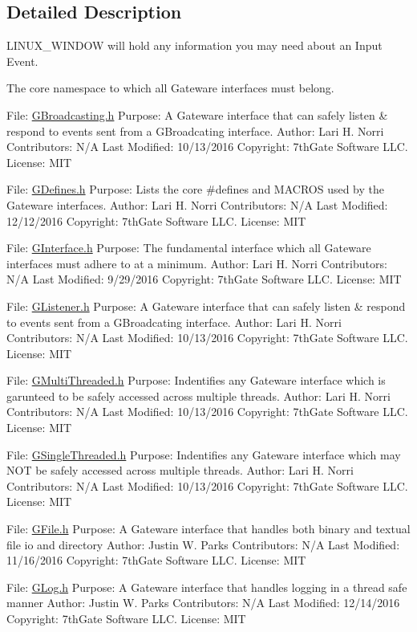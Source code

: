 \subsection{Detailed Description}
L\+I\+N\+U\+X\+\_\+\+W\+I\+N\+D\+OW will hold any information you may need about an Input Event.

The core namespace to which all Gateware interfaces must belong.

File\+: \hyperlink{_g_broadcasting_8h_source}{G\+Broadcasting.\+h} Purpose\+: A Gateware interface that can safely listen \& respond to events sent from a G\+Broadcating interface. Author\+: Lari H. Norri Contributors\+: N/A Last Modified\+: 10/13/2016 Copyright\+: 7th\+Gate Software L\+LC. License\+: M\+IT

File\+: \hyperlink{_g_defines_8h_source}{G\+Defines.\+h} Purpose\+: Lists the core \#defines and M\+A\+C\+R\+OS used by the Gateware interfaces. Author\+: Lari H. Norri Contributors\+: N/A Last Modified\+: 12/12/2016 Copyright\+: 7th\+Gate Software L\+LC. License\+: M\+IT

File\+: \hyperlink{_g_interface_8h_source}{G\+Interface.\+h} Purpose\+: The fundamental interface which all Gateware interfaces must adhere to at a minimum. Author\+: Lari H. Norri Contributors\+: N/A Last Modified\+: 9/29/2016 Copyright\+: 7th\+Gate Software L\+LC. License\+: M\+IT

File\+: \hyperlink{_g_listener_8h_source}{G\+Listener.\+h} Purpose\+: A Gateware interface that can safely listen \& respond to events sent from a G\+Broadcating interface. Author\+: Lari H. Norri Contributors\+: N/A Last Modified\+: 10/13/2016 Copyright\+: 7th\+Gate Software L\+LC. License\+: M\+IT

File\+: \hyperlink{_g_multi_threaded_8h_source}{G\+Multi\+Threaded.\+h} Purpose\+: Indentifies any Gateware interface which is garunteed to be safely accessed across multiple threads. Author\+: Lari H. Norri Contributors\+: N/A Last Modified\+: 10/13/2016 Copyright\+: 7th\+Gate Software L\+LC. License\+: M\+IT

File\+: \hyperlink{_g_single_threaded_8h_source}{G\+Single\+Threaded.\+h} Purpose\+: Indentifies any Gateware interface which may N\+OT be safely accessed across multiple threads. Author\+: Lari H. Norri Contributors\+: N/A Last Modified\+: 10/13/2016 Copyright\+: 7th\+Gate Software L\+LC. License\+: M\+IT

File\+: \hyperlink{_g_file_8h_source}{G\+File.\+h} Purpose\+: A Gateware interface that handles both binary and textual file io and directory Author\+: Justin W. Parks Contributors\+: N/A Last Modified\+: 11/16/2016 Copyright\+: 7th\+Gate Software L\+LC. License\+: M\+IT

File\+: \hyperlink{_g_log_8h_source}{G\+Log.\+h} Purpose\+: A Gateware interface that handles logging in a thread safe manner Author\+: Justin W. Parks Contributors\+: N/A Last Modified\+: 12/14/2016 Copyright\+: 7th\+Gate Software L\+LC. License\+: M\+IT 